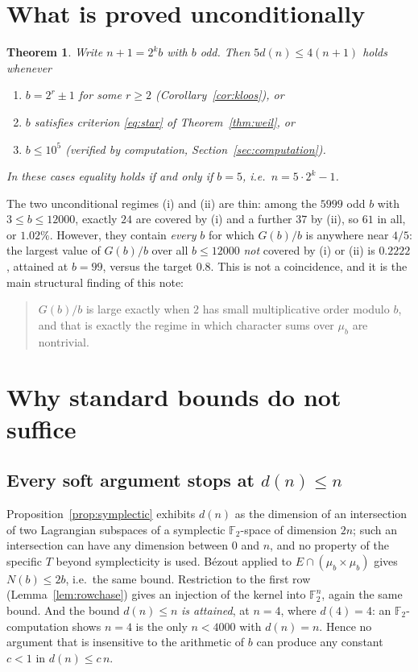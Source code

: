 \documentclass[a4paper]{article}
\newtheorem{theorem}{Theorem}[section]
\theoremstyle{definition}
\newcommand{\F}{\mathbb{F}}
\begin{document}
	\section{What is proved unconditionally}\label{sec:unconditional}
	\begin{theorem}\label{thm:final}
		Write $n + 1 = 2^k b$ with $b$ odd.
		Then $5 d(n) \leq 4(n+1)$ holds whenever
		\begin{enumerate}[label=(\roman*)]
			\item $b = 2^r \pm 1$ for some $r \geq 2$ (Corollary~\ref{cor:kloos}), or
			\item $b$ satisfies criterion \eqref{eq:star} of Theorem~\ref{thm:weil}, or
			\item $b \le 10^5$ (verified by computation, Section~\ref{sec:computation}).
		\end{enumerate}
		In these cases equality holds if and only if $b = 5$, i.e.\ $n = 5 \cdot 2^k - 1$.
	\end{theorem}

	The two unconditional regimes (i) and (ii) are thin: among the $5999$ odd $b$ with $3 \le b \le 12000$, exactly $24$ are covered by (i) and a further $37$ by (ii), so $61$ in all, or $1.02\%$.
	However, they contain \emph{every} $b$ for which $G(b)/b$ is anywhere near $4/5$: the largest value of $G(b)/b$ over all $b \le 12000$ \emph{not} covered by (i) or (ii) is $0.2222$, attained at $b = 99$, versus the target $0.8$.
	This is not a coincidence, and it is the main structural finding of this note:
	\begin{quote}
		$G(b)/b$ is large exactly when $2$ has small multiplicative order modulo $b$, and that is exactly the regime in which character sums over $\mu_b$ are nontrivial.
	\end{quote}

	\section{Why standard bounds do not suffice}\label{sec:barrier}
	\subsection{Every soft argument stops at $d(n) \leq n$}
	Proposition~\ref{prop:symplectic} exhibits $d(n)$ as the dimension of an intersection of two Lagrangian subspaces of a symplectic $\F_2$-space of dimension $2n$; such an intersection can have any dimension between $0$ and $n$, and no property of the specific $T$ beyond symplecticity is used.
	Bézout applied to $E \cap (\mu_b\times\mu_b)$ gives $N(b) \le 2b$, i.e.\ the same bound.
	Restriction to the first row (Lemma~\ref{lem:rowchase}) gives an injection of the kernel into $\F_2^n$, again the same bound.
	And the bound $d(n) \leq n$ \emph{is attained}, at $n = 4$, where $d(4) = 4$: an $\F_2$-computation shows $n = 4$ is the only $n < 4000$ with $d(n) = n$.
	Hence no argument that is insensitive to the arithmetic of $b$ can produce any constant $c < 1$ in $d(n) \le c\, n$.
\end{document}
